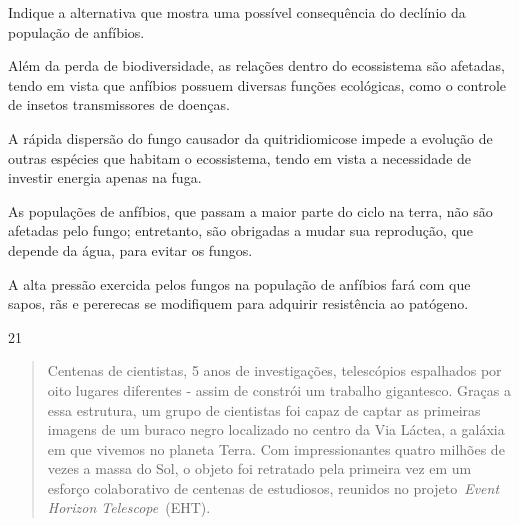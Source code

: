 
\pagebreak
Indique a alternativa que mostra uma possível consequência do declínio da população de anfíbios.

\begin{escolha}
\item Além da perda de biodiversidade, as relações dentro do ecossistema são afetadas, tendo em vista que anfíbios possuem diversas funções ecológicas, como o controle de insetos transmissores de doenças.

\item A rápida dispersão do fungo causador da quitridiomicose impede a evolução de outras espécies que habitam o ecossistema, tendo em vista a
necessidade de investir energia apenas na fuga.

\item As populações de anfíbios, que passam a maior parte do ciclo na terra,
não são afetadas pelo fungo; entretanto, são obrigadas a mudar sua
reprodução, que depende da água, para evitar os fungos.

\item A alta pressão exercida pelos fungos na população de anfíbios fará
com que sapos, rãs e pererecas se modifiquem para adquirir resistência ao patógeno.
\end{escolha}

\num{21}
\begin{quote}
Centenas de cientistas, 5 anos
de investigações, telescópios espalhados por oito lugares diferentes - assim de constrói um trabalho gigantesco. Graças a essa estrutura, um grupo de cientistas foi capaz de captar as primeiras imagens de um buraco negro localizado no centro da Via Láctea, a galáxia em que vivemos no planeta Terra. 
Com impressionantes quatro
milhões de vezes a massa do Sol, o objeto foi retratado pela primeira vez
em um esforço colaborativo de centenas de estudiosos, reunidos
no projeto~\emph{Event Horizon Telescope}~(EHT).

\end{quote}

